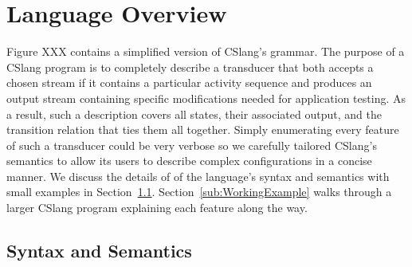 \section{Language Overview}
\label{sec:Overview}

Figure XXX contains a simplified version of CSlang's grammar.  The purpose
of a CSlang program is to completely describe a transducer that both
accepts a chosen stream if it contains a particular
activity sequence and produces an output stream containing specific
modifications needed for application testing.  As a result, such a
description covers all states, their associated output, and the transition
relation that ties them all together.
Simply enumerating every feature of such a transducer could be very verbose
so we carefully tailored CSlang's semantics to allow its users to
describe complex configurations in a concise manner.
We discuss the details of of the
language's syntax and semantics with small examples in
Section~\ref{sub:SyntaxAndSemantics}.  Section~\ref{sub:WorkingExample} walks through a
larger CSlang program explaining each feature along the way.

\subsection{Syntax and Semantics}
\label{sub:SyntaxAndSemantics}



